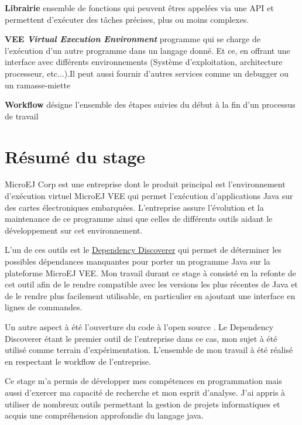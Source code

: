 \documentclass[french,a4paper,12pt]{report}
\begin{document}
\bigskip

\hypertarget{Librairie}{\noindent\textbf{Librairie} ensemble de fonctions qui peuvent êtres appelées via une API et permettent d'exécuter des tâches précises, plus ou moins complexes.}

\bigskip

\hypertarget{VEE}{\noindent\textbf{VEE \emph{Virtual Execution Environment}} programme qui se charge de l’exécution d'un autre programme dans un langage donné. Et ce, en offrant une interface avec différents environnements (Système d'exploitation, architecture processeur, etc...).Il peut aussi fournir d'autres services comme un debugger ou un ramasse-miette}

\hypertarget{Workflow}{\noindent\textbf{Workflow} désigne l'ensemble des étapes suivies du début à la fin d'un processus de travail}

\chapter*{Résumé du stage}

MicroEJ Corp est une entreprise dont le produit principal est l'environnement d’exécution virtuel MicroEJ VEE qui permet l’exécution d'applications Java sur des cartes électroniques embarquées. L'entreprise assure l'évolution et la maintenance de ce programme ainsi que celles de différents outils aidant le développement sur cet environnement.

L'un de ces outils est le \href{https://github.com/MicroEJ/Tool-ApiDependencyDiscoverer}{Dependency Discoverer} qui permet de déterminer les possibles dépendances manquantes pour porter un programme Java sur la plateforme MicroEJ VEE. Mon travail durant ce stage à consisté en la refonte de cet outil afin de le rendre compatible avec les versions les plus récentes de Java et de le rendre plus facilement utilisable, en particulier en ajoutant une interface en lignes de commandes. 

Un autre aspect à été l'ouverture du code à l'open source . Le Dependency Discoverer étant le premier outil de l'entreprise dans ce cas, mon sujet à été utilisé comme terrain d'expérimentation. L'ensemble de mon travail à été réalisé en respectant le workflow de l'entreprise.

Ce stage m'a permis de développer mes compétences en programmation mais aussi d'exercer ma capacité de recherche et mon esprit d'analyse. J'ai appris à utiliser de nombreux outils permettant la gestion de projets informatiques et acquis une compréhension approfondie du langage java.  
\end{document}
